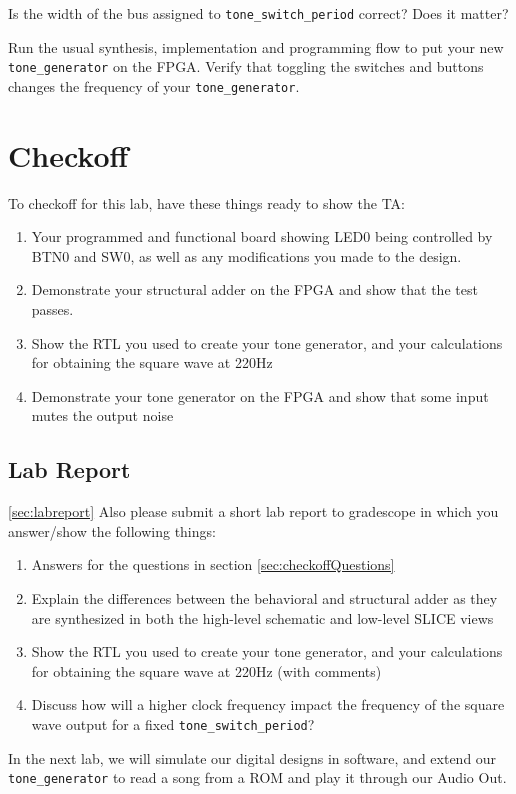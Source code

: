 \documentclass[11pt]{article}
\begin{document}
Is the width of the bus assigned to \verb|tone_switch_period| correct? Does it matter?

Run the usual synthesis, implementation and programming flow to put your new \verb|tone_generator| on the FPGA. Verify that toggling the switches and buttons changes the frequency of your \verb|tone_generator|.

\section{Checkoff}
To checkoff for this lab, have these things ready to show the TA:

\begin{enumerate}
  \item Your programmed and functional board showing LED0 being controlled by BTN0 and SW0, as well as any modifications you made to the design.
  \item Demonstrate your structural adder on the FPGA and show that the test passes.
  \item Show the RTL you used to create your tone generator, and your calculations for obtaining the square wave at 220Hz
  \item Demonstrate your tone generator on the FPGA and show that some input mutes the output noise
\end{enumerate}

\subsection{Lab Report}\ref{sec:labreport}
Also please submit a short lab report to gradescope in which you answer/show the following things:
\begin{enumerate}
  \item Answers for the questions in section \ref{sec:checkoffQuestions}
  \item Explain the differences between the behavioral and structural adder as they are synthesized in both the high-level schematic and low-level SLICE views
  \item Show the RTL you used to create your tone generator, and your calculations for obtaining the square wave at 220Hz (with comments)
  \item Discuss how will a higher clock frequency impact the frequency of the square wave output for a fixed \verb|tone_switch_period|?
\end{enumerate}

In the next lab, we will simulate our digital designs in software, and extend our \verb|tone_generator| to read a song from a ROM and play it through our Audio Out.
\end{document}
